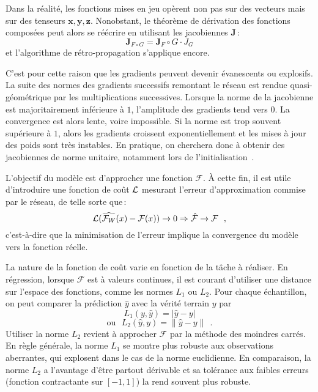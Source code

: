 Dans la réalité, les fonctions mises en jeu opèrent non pas sur des vecteurs mais sur des tenseurs $\mathbf{x}, \mathbf{y}, \mathbf{z}$. Nonobstant, le théorème de dérivation des fonctions composées peut alors se réécrire en utilisant les jacobiennes $\mathbf{J}$\,:
$$\mathbf{J}_{F \circ G} = \mathbf{J}_F \circ G \cdot J_G$$
et l'algorithme de rétro-propagation s'applique encore.

C'est pour cette raison que les gradients peuvent devenir évanescents ou explosifs. La suite des normes des gradients successifs remontant le réseau est rendue quasi-géométrique par les multiplications successives. Lorsque la norme de la jacobienne est majoritairement inférieure à $1$, l'amplitude des gradients tend vers $0$. La convergence est alors lente, voire impossible. Si la norme est trop souvent supérieure à $1$, alors les gradients croissent exponentiellement et les mises à jour des poids sont très instables. En pratique, on cherchera donc à obtenir des jacobiennes de norme unitaire, notamment lors de l'initialisation~\cite{saxe_exact_2014}.

%

L'objectif du modèle est d'approcher une fonction $\mathcal{F}$. À cette fin, il est utile d'introduire une fonction de coût $\mathcal{L}$ mesurant l'erreur d'approximation commise par le réseau, de telle sorte que\,:
$$\mathcal{L}(\widehat{\mathcal{F}_W}(x) - \mathcal{F}(x)) \rightarrow 0 \Rightarrow \hat{\mathcal{F}} \rightarrow \mathcal{F}~~,$$
c'est-à-dire que la minimisation de l'erreur implique la convergence du modèle vers la fonction réelle.

La nature de la fonction de coût varie en fonction de la tâche à réaliser. En régression, lorsque $\mathcal{F}$ est à valeurs continues, il est courant d'utiliser une distance sur l'espace des fonctions, comme les normes $L_1$ ou $L_2$. Pour chaque échantillon, on peut comparer la prédiction $\hat{y}$ avec la vérité terrain $y$ par
$$L_1(y,\hat{y}) = |\hat{y} - y|$$
$$\text{ou}~~~L_2(\hat{y},y) = \lVert \hat{y} - y \rVert~~.$$
Utiliser la norme $L_2$ revient à approcher $\mathcal{F}$ par la méthode des moindres carrés. En règle générale, la norme $L_1$ se montre plus robuste aux observations aberrantes, qui explosent dans le cas de la norme euclidienne. En comparaison, la norme $L_2$ a l'avantage d'être partout dérivable et sa tolérance aux faibles erreurs (fonction contractante sur $[-1, 1]$) la rend souvent plus robuste.

